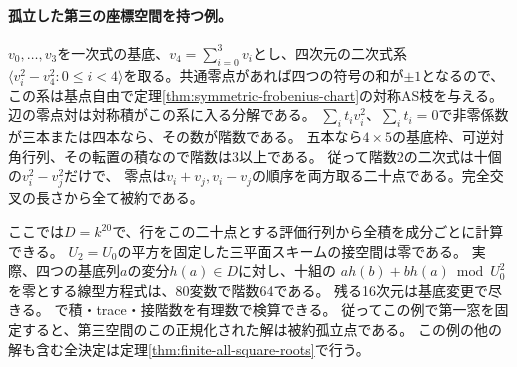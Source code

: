 \paragraph{孤立した第三の座標空間を持つ例。}
$v_0,\ldots,v_3$を一次式の基底、$v_4=\sum_{i=0}^3v_i$とし、四次元の二次式系
$\langle v_i^2-v_4^2:0\le i<4\rangle$を取る。共通零点があれば四つの符号の和が$\pm1$となるので、
この系は基点自由で定理\ref{thm:symmetric-frobenius-chart}の対称AS枝を与える。
辺の零点対は対称積がこの系に入る分解である。
$\sum_i t_i v_i^2$、$\sum_i t_i=0$で非零係数が三本または四本なら、その数が階数である。
五本なら$4\times5$の基底枠、可逆対角行列、その転置の積なので階数は3以上である。
従って階数2の二次式は十個の$v_i^2-v_j^2$だけで、
零点は$v_i+v_j,v_i-v_j$の順序を両方取る二十点である。完全交叉の長さから全て被約である。

ここでは$D=k^{20}$で、行をこの二十点とする評価行列から全積を成分ごとに計算できる。
$U_2=U_0$の平方を固定した三平面スキームの接空間は零である。
実際、四つの基底列$a$の変分$h(a)\in D$に対し、十組の
$a h(b)+b h(a)\bmod U_0^2$を零とする線型方程式は、80変数で階数64である。
残る16次元は基底変更で尽きる。
で積・trace・接階数を有理数で検算できる。
従ってこの例で第一窓を固定すると、第三空間のこの正規化された解は被約孤立点である。
この例の他の解も含む全決定は定理\ref{thm:finite-all-square-roots}で行う。

